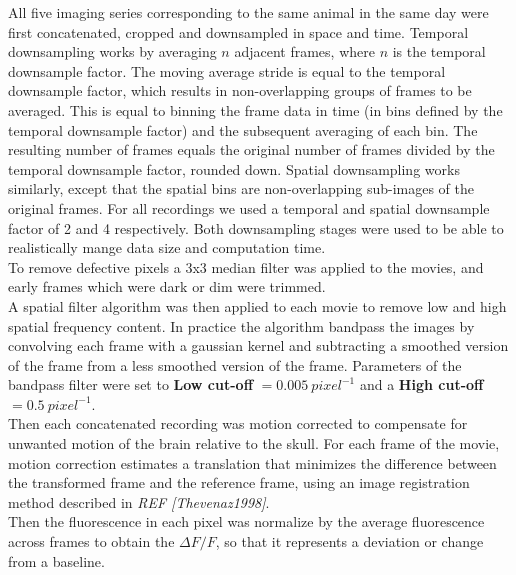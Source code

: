 All five imaging series corresponding to the same animal in the same day were first concatenated, cropped and downsampled in space and time. 
Temporal downsampling works by averaging $n$ adjacent frames, where $n$ is the temporal downsample factor. 
The moving average stride is equal to the temporal downsample factor, which results in non-overlapping groups of frames to be averaged. 
This is equal to binning the frame data in time (in bins defined by the temporal downsample factor) and the subsequent averaging of each bin. 
The resulting number of frames equals the original number of frames divided by the temporal downsample factor, rounded down. 
Spatial downsampling works similarly, except that the spatial bins are non-overlapping sub-images of the original frames.
For all recordings we used a temporal and spatial downsample factor of 2 and 4 respectively.  
Both downsampling stages were used to be able to realistically mange data size and computation time. \\
To remove defective pixels a 3x3 median filter was applied to the movies, and early frames which were dark or dim were trimmed.\\  
A spatial filter algorithm was then applied to each movie to remove low and high spatial frequency content. In practice the algorithm bandpass the images by convolving each frame with a gaussian kernel and subtracting a smoothed version of the frame from a less smoothed version of the frame.
Parameters of the bandpass filter were set to \textbf{Low cut-off} $ = 0.005 \ {pixel}^{-1}$ and a  \textbf{High cut-off} $ = 0.5 \ {pixel}^{-1}$. \\
Then each concatenated recording was motion corrected to compensate for unwanted motion of the brain relative to the skull.
For each frame of the movie, motion correction estimates a translation that minimizes the difference between the transformed frame and the reference frame, using an image registration method described in \textit{REF [Thevenaz1998]}. \\
Then the fluorescence in each pixel was normalize by the average fluorescence across frames to obtain the $\Delta F/F$, so that it represents a deviation or change from a baseline.  
